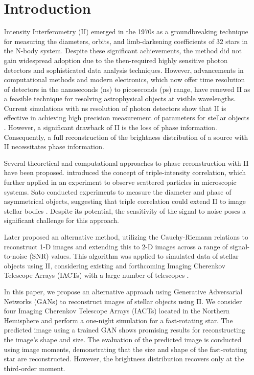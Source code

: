 \section{Introduction}

Intensity Interferometry (II) emerged in the 1970s as a groundbreaking technique for measuring the diameters, orbits, and limb-darkening coefficients of 32 stars in the N-body system. Despite these significant achievements, the method did not gain widespread adoption due to the then-required highly sensitive photon detectors and sophisticated data analysis techniques. However, advancements in computational methods and modern electronics, which now offer time resolution of detectors in the nanoseconds (ns) to picoseconds (ps) range, have renewed II as a feasible technique for resolving astrophysical objects at visible wavelengths. Current simulations with ns resolution of photon detectors show that II is effective in achieving high precision measurement of parameters for stellar objects \citep{10.1093/mnras/stab2391, 10.1093/mnras/stac2433}. However, a significant drawback of II is the loss of phase information. Consequently, a full reconstruction of the brightness distribution of a source with II necessitates phase information.

Several theoretical and computational approaches to phase reconstruction with II have been proposed. \cite{gamo1963triple} introduced the concept of triple-intensity correlation, which \cite{goldberger1963use} further applied in an experiment to observe scattered particles in microscopic systems. Sato conducted experiments to measure the diameter and phase of asymmetrical objects, suggesting that triple correlation could extend II to image stellar bodies \citep{sato1978imaging, sato1979computer, sato1981adaptive}. Despite its potential, the sensitivity of the signal to noise poses a significant challenge for this approach.

Later \cite{holmes2010two} proposed an alternative method, utilizing the Cauchy-Riemann relations to reconstruct 1-D images and extending this to 2-D images across a range of signal-to-noise (SNR) values. This algorithm was applied to simulated data of stellar objects using II, considering existing and forthcoming Imaging Cherenkov Telescope Arrays (IACTs) with a large number of telescopes \citep{nunez2010stellar, nunez2012high, nunez2012imaging}.

In this paper, we propose an alternative approach using Generative Adversarial Networks (GANs) \citep{goodfellow2014generative} to reconstruct images of stellar objects using II. We consider four Imaging Cherenkov Telescope Arrays (IACTs) located in the Northern Hemisphere and perform a one-night simulation for a fast-rotating star. The predicted image using a trained GAN shows promising results for reconstructing the image's shape and size. The evaluation of the predicted image is conducted using image moments, demonstrating that the size and shape of the fast-rotating star are reconstructed. However, the brightness distribution recovers only at the third-order moment.

